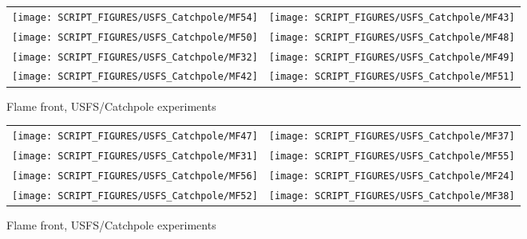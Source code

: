 \begin{figure}[p]
\begin{tabular*}{\textwidth}{l@{\extracolsep{\fill}}r}
\texttt{[image: SCRIPT\_FIGURES/USFS\_Catchpole/MF54]} &
\texttt{[image: SCRIPT\_FIGURES/USFS\_Catchpole/MF43]} \\
\texttt{[image: SCRIPT\_FIGURES/USFS\_Catchpole/MF50]} &
\texttt{[image: SCRIPT\_FIGURES/USFS\_Catchpole/MF48]} \\
\texttt{[image: SCRIPT\_FIGURES/USFS\_Catchpole/MF32]} &
\texttt{[image: SCRIPT\_FIGURES/USFS\_Catchpole/MF49]} \\
\texttt{[image: SCRIPT\_FIGURES/USFS\_Catchpole/MF42]} &
\texttt{[image: SCRIPT\_FIGURES/USFS\_Catchpole/MF51]} \\
\end{tabular*}
\caption[Flame front, USFS/Catchpole experiments]{Flame front, USFS/Catchpole experiments}
\label{USFS_Catchpole_008}
\end{figure}

\begin{figure}[p]
\begin{tabular*}{\textwidth}{l@{\extracolsep{\fill}}r}
\texttt{[image: SCRIPT\_FIGURES/USFS\_Catchpole/MF47]} &
\texttt{[image: SCRIPT\_FIGURES/USFS\_Catchpole/MF37]} \\
\texttt{[image: SCRIPT\_FIGURES/USFS\_Catchpole/MF31]} &
\texttt{[image: SCRIPT\_FIGURES/USFS\_Catchpole/MF55]} \\
\texttt{[image: SCRIPT\_FIGURES/USFS\_Catchpole/MF56]} &
\texttt{[image: SCRIPT\_FIGURES/USFS\_Catchpole/MF24]} \\
\texttt{[image: SCRIPT\_FIGURES/USFS\_Catchpole/MF52]} &
\texttt{[image: SCRIPT\_FIGURES/USFS\_Catchpole/MF38]} \\
\end{tabular*}
\caption[Flame front, USFS/Catchpole experiments]{Flame front, USFS/Catchpole experiments}
\label{USFS_Catchpole_016}
\end{figure}

